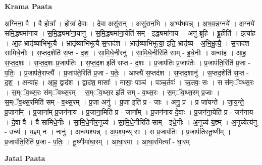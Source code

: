 \documentclass[17pt]{extarticle}
\begin{document}
\textbf{Krama Paata} \newline

अ॒ग्निना॒ वै । वै होत्रा᳚ । होत्रा॑ दे॒वाः । दे॒वा असु॑रान् । असु॑रान॒भि । अ॒भ्य॑भवन्न् । अ॒भ॒व॒न्न॒ग्नये᳚ । अ॒ग्नये॑ समि॒द्ध्यमा॑नाय । स॒मि॒द्ध्यमा॑ना॒यानु॑ । स॒मि॒द्ध्यमा॑ना॒येति॑ सम् - इ॒द्ध्यमा॑नाय । अनु॑ ब्रूहि । ब्रू॒हीति॑ । इत्या॑ह । आ॒ह॒ भ्रातृ॑व्याभिभूत्यै । भ्रातृ॑व्याभिभूत्यै स॒प्तद॑श । भ्रातृ॑व्याभिभूत्या॒ इति॒ भ्रातृ॑व्य - अ॒भि॒भू॒त्यै॒ । स॒प्तद॑श सामिधे॒नीः । स॒प्तद॒शेति॑ स॒प्त - द॒श॒ । सा॒मि॒धे॒नीरनु॑ । सा॒मि॒धे॒नीरिति॑ साम् - इ॒धे॒नीः । अन्वा॑ह । आ॒ह॒ स॒प्त॒द॒शः । स॒प्त॒द॒शः प्र॒जाप॑तिः । स॒प्त॒द॒श इति॑ सप्त - द॒शः । प्र॒जाप॑तिः प्र॒जाप॑तेः । प्र॒जाप॑ति॒रिति॑ प्र॒जा - प॒तिः॒ । प्र॒जाप॑ते॒राप्त्यै᳚ । प्र॒जाप॑ते॒रिति॑ प्र॒जा - प॒तेः॒ । आप्त्यै॑ स॒प्तद॑श । स॒प्तद॒शानु॑ । स॒प्तद॒शेति॑ स॒प्त - द॒श॒ । अन्वा॑ह । आ॒ह॒ द्वाद॑श । द्वाद॑श॒ मासाः᳚ । मासाः॒ पञ्च॑ । पञ्च॒र्तवः॑ । ऋ॒तवः॒ सः । 
स स॑म्ॅवथ्स॒रः । स॒म्ॅव॒थ्स॒रः स॑म्ॅवथ्स॒रम् । स॒म्ॅव॒थ्स॒र इति॑ सम् - व॒थ्स॒रः । स॒म्ॅव॒थ्स॒रम् प्र॒जाः । स॒म्ॅव॒थ्स॒रमिति॑ सम् - व॒थ्स॒रम् । प्र॒जा अनु॑ । प्र॒जा इति॑ प्र - जाः । अनु॒ प्र । प्र जा॑यन्ते । जा॒य॒न्ते॒ प्र॒जाना᳚म् । प्र॒जाना᳚म् प्र॒जन॑नाय । प्र॒जाना॒मिति॑ प्र - जाना᳚म् । प्र॒जन॑नाय दे॒वाः । प्र॒जन॑ना॒येति॑ प्र - जन॑नाय । दे॒वा वै । वै सा॑मिधे॒नीः । सा॒मि॒धे॒नीर॒नूच्य॑ । सा॒मि॒धे॒नीरिति॑ साम् - इ॒धे॒नीः । अ॒नूच्य॑ य॒ज्ञ्म् । अ॒नूच्येत्य॑नु - उच्य॑ । य॒ज्ञ्म् न । नानु॑ । अन्व॑पश्यन्न् । अ॒प॒श्य॒न्थ् सः । स प्र॒जाप॑तिः । प्र॒जाप॑तिस्तू॒ष्णीम् । प्र॒जाप॑ति॒रिति॑ प्र॒जा - प॒तिः॒ । तू॒ष्णीमा॑घा॒रम् । आ॒घा॒रमा । आ॒घा॒रमित्या᳚ - घा॒रम् \newline

\textbf{Jatai Paata} \newline
\end{document}
